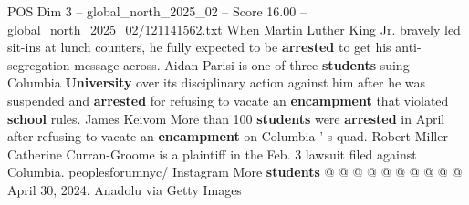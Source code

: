\begin{textsample}{POS Dim 3 – global\_north\_2025\_02 – Score 16.00 – global\_north\_2025\_02/121141562.txt}
When Martin Luther King Jr. bravely led sit-ins at lunch counters, he fully expected to be \textbf{arrested} to get his anti-segregation message across.
Aidan Parisi is one of three \textbf{students} suing Columbia \textbf{University} over its disciplinary action against him after he was suspended and \textbf{arrested} for refusing to vacate an \textbf{encampment} that violated \textbf{school} rules.
James Keivom More than 100 \textbf{students} were \textbf{arrested} in April after refusing to vacate an \textbf{encampment} on Columbia ' s quad.
Robert Miller Catherine Curran-Groome is a plaintiff in the Feb. 3 lawsuit filed against Columbia. peoplesforumnyc/ Instagram More \textbf{students} @ @ @ @ @ @ @ @ @ @ April 30, 2024.
Anadolu via Getty Images

\end{textsample}
